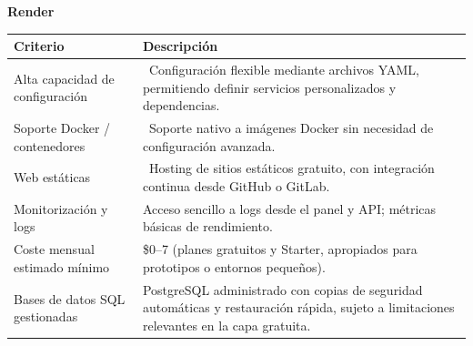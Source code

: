 \begin{center}
	\renewcommand{\arraystretch}{1.2}
	\setlength{\tabcolsep}{6pt}
	\textbf{Render}\\[4pt]
	\begin{tabularx}{\textwidth}{|l|X|}
		\hline
		\textbf{Criterio}               & \textbf{Descripción}                                                                                                                     \\
		\hline
		Alta capacidad de configuración & \checkmark\ Configuración flexible mediante archivos YAML, permitiendo definir servicios personalizados y dependencias.                  \\
		\hline
		Soporte Docker / contenedores   & \checkmark\ Soporte nativo a imágenes Docker sin necesidad de configuración avanzada.                                                    \\
		\hline
		Web estáticas                   & \checkmark\ Hosting de sitios estáticos gratuito, con integración continua desde GitHub o GitLab.                                        \\
		\hline
		Monitorización y logs           & Acceso sencillo a logs desde el panel y API; métricas básicas de rendimiento.                                                            \\
		\hline
		Coste mensual estimado mínimo   & \$0--7 (planes gratuitos y Starter, apropiados para prototipos o entornos pequeños).                                                     \\
		\hline
		Bases de datos SQL gestionadas  & PostgreSQL administrado con copias de seguridad automáticas y restauración rápida, sujeto a limitaciones relevantes en la capa gratuita. \\
		\hline
	\end{tabularx}
\end{center}

\vspace{8pt}

